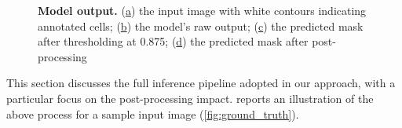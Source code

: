 \begin{figure}
    \caption{\textbf{Model output.} 
    (\hyperref[fig:ground_truth]{a}) the input image with white contours indicating annotated cells; (\hyperref[fig:heatmap]{b}) the model's raw output; 
    (\hyperref[fig:thresh]{c}) the predicted mask after thresholding at 0.875; (\hyperref[fig:post_proc]{d}) the predicted mask after post-processing}
    \label{fig:model_output}
\end{figure}
This section discusses the full inference pipeline adopted in our approach, with a particular focus on the post-processing impact.
 reports an illustration of the above process for a sample input image (\cref{fig:ground_truth}).

